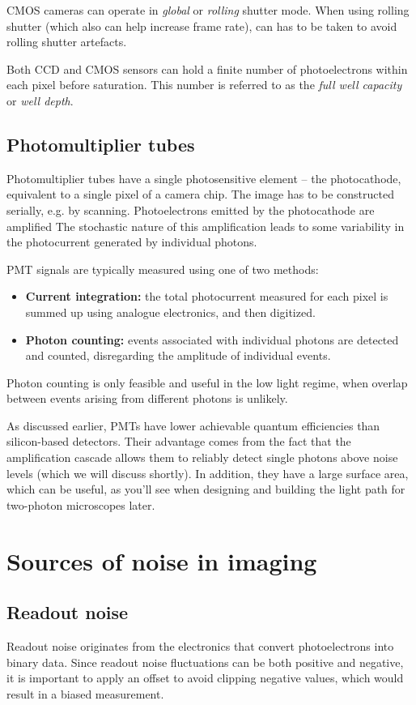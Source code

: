 \documentclass[a4paper]{report}
\begin{document}
CMOS cameras can operate in \textit{global} or \textit{rolling} shutter mode. 
When using rolling shutter (which also can help increase frame rate), can has to be taken to avoid rolling shutter artefacts.

Both CCD and CMOS sensors can hold a finite number of photoelectrons within each pixel before saturation. This number is referred to as the \textit{full well capacity} or \textit{well depth}.
\subsection{Photomultiplier tubes}
Photomultiplier tubes have a single photosensitive element -- the photocathode, equivalent to a single pixel of a camera chip. 
The image has to be constructed serially, e.g. by scanning. 
Photoelectrons emitted by the photocathode are amplified 
The stochastic nature of this amplification leads to some variability in the photocurrent generated by individual photons. 

PMT signals are typically measured using one of two methods:
\begin{itemize}
	\item \textbf{Current integration:} the total photocurrent measured for each pixel is summed up using analogue electronics, and then digitized.
	\item \textbf{Photon counting:} events associated with individual photons are detected and counted, disregarding the amplitude of individual events.
\end{itemize} 
Photon counting is only feasible and useful in the low light regime, when overlap between events arising from different photons is unlikely.

As discussed earlier, PMTs have lower achievable quantum efficiencies than silicon-based detectors. 
Their advantage comes from the fact that the amplification cascade allows them to reliably detect single photons above noise levels (which we will discuss shortly). 
In addition, they have a large surface area, which can be useful, as you'll see when designing and building the light path for two-photon microscopes later.

\section{Sources of noise in imaging}
\subsection{Readout noise}
Readout noise originates from the electronics that convert photoelectrons into binary data. 
Since readout noise fluctuations can be both positive and negative, it is important to apply an offset to avoid clipping negative values, which would result in a biased measurement.
\end{document}
